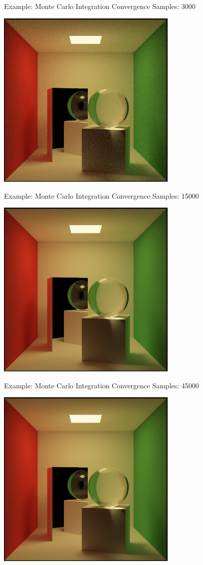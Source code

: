 \documentclass{beamer}
\begin{document}
\begin{frame}{Example: Monte Carlo Integration Convergence}
    Samples: 3000
    \begin{center}
        \includegraphics[width=0.65\textwidth]{../img/convergence/cornell-03000.png}
    \end{center}
\end{frame}

\begin{frame}{Example: Monte Carlo Integration Convergence}
    Samples: 15000
    \begin{center}
        \includegraphics[width=0.65\textwidth]{../img/convergence/cornell-15000.png}
    \end{center}
\end{frame}

\begin{frame}{Example: Monte Carlo Integration Convergence}
    Samples: 45000
    \begin{center}
        \includegraphics[width=0.65\textwidth]{../img/convergence/cornell-45000.png}
    \end{center}
\end{frame}
\end{document}
